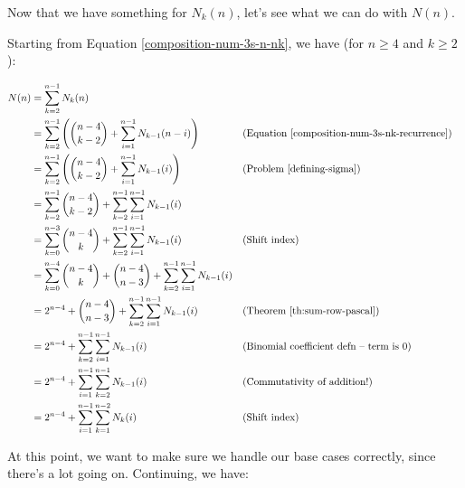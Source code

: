 Now that we have something for $N_k(n)$, let's see what we can do with $N(n)$. 

Starting from Equation \ref{composition-num-3s-n-nk}, we have (for $n \geq 4$ and $k \geq 2$):

\begin{align*}
N(n) &= \sum_{k=2}^{n-1} N_k(n) \\
&= \sum_{k=2}^{n-1} \left( \binom{n-4}{k-2} + \sum_{i=1}^{n-1} N_{k-1}(n-i) \right) && \text{(Equation \ref{composition-num-3s-nk-recurrence})} \\
&= \sum_{k=2}^{n-1} \left( \binom{n-4}{k-2} + \sum_{i=1}^{n-1} N_{k-1}(i) \right) && \text{(Problem \ref{defining-sigma})} \\
&= \sum_{k=2}^{n-1} \binom{n-4}{k-2} + \sum_{k=2}^{n-1} \sum_{i=1}^{n-1} N_{k-1}(i) \\
&= \sum_{k=0}^{n-3} \binom{n-4}{k} + \sum_{k=2}^{n-1} \sum_{i=1}^{n-1} N_{k-1}(i) && \text{(Shift index)} \\
&= \sum_{k=0}^{n-4} \binom{n-4}{k} + \binom{n-4}{n-3} + \sum_{k=2}^{n-1} \sum_{i=1}^{n-1} N_{k-1}(i) \\
&= 2^{n-4} + \binom{n-4}{n-3} + \sum_{k=2}^{n-1} \sum_{i=1}^{n-1} N_{k-1}(i) && \text{(Theorem \ref{th:sum-row-pascal})} \\
&= 2^{n-4} + \sum_{k=2}^{n-1} \sum_{i=1}^{n-1} N_{k-1}(i) && \text{(Binomial coefficient defn -- term is 0)} \\
&= 2^{n-4} + \sum_{i=1}^{n-1} \sum_{k=2}^{n-1} N_{k-1}(i) && \text{(Commutativity of addition!)} \\
&= 2^{n-4} + \sum_{i=1}^{n-1} \sum_{k=1}^{n-2} N_{k}(i) && \text{(Shift index)}
\end{align*}


At this point, we want to make sure we handle our base cases correctly, since there's a lot going on. Continuing, we have:

